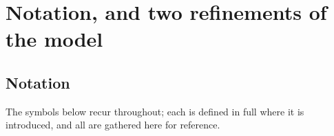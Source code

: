 \section{Notation, and two refinements of the model}
\label{app:notation}

\subsection{Notation}

\noindent The symbols below recur throughout; each is defined in full where it is
introduced, and all are gathered here for reference.

\vspace{4pt}

